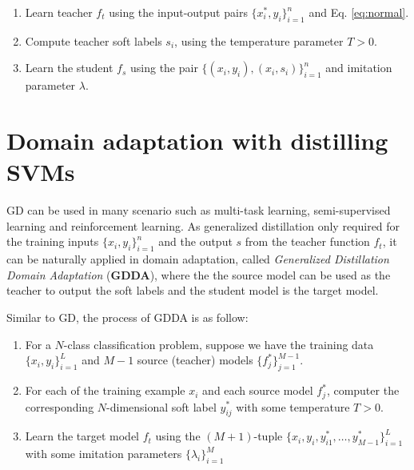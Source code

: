 \documentclass[11pt,onecolumn]{article}
\begin{document}
\begin{enumerate}
\item Learn teacher ${f}_t$ using the input-output pairs $\{x^*_i,y_i\}_{i=1}^n$ and Eq. \ref{eq:normal}.
\item Compute teacher soft labels $s_i$, using the temperature parameter $T > 0$.
\item Learn the student ${f}_s$ using the pair $\{\left(x_i,y_i\right),\left(x_i,s_i\right)\}_{i=1}^n$ and imitation parameter $\lambda$.
\end{enumerate}

\section{Domain adaptation with distilling SVMs}

GD can be used in many scenario such as multi-task learning, semi-supervised learning and reinforcement learning. As generalized distillation only required for the training inputs $\{x_i,y_i\}_{i=1}^n$ and the output $s$ from the teacher function $f_t$, it can be naturally applied in domain adaptation, called \textit{Generalized Distillation Domain Adaptation} (\textbf{GDDA}), where the the source model can be used as the teacher to output the soft labels and the student model is the target model. 

Similar to GD, the process of GDDA is as follow:
\begin{enumerate}
	\item For a $N$-class classification problem, suppose we have the training data $\{x_i,y_i\}_{i=1}^L$ and $M-1$ source (teacher) models $\{f^*_j\}_{j=1}^{M-1}$.
	\item For each of the training example $x_i$ and each source model $f^*_j$, computer the corresponding $N$-dimensional soft label $y^*_{ij}$ with some temperature $T>0$.
	\item Learn the target model $f_t$ using the $(M+1)$-tuple $\{x_i,y_i,y^*_{i1},\dots,y^*_{M-1}\}_{i=1}^L$ with some imitation parameters $\{\lambda_i\}^M_{i=1}$
\end{enumerate} 
\end{document}
